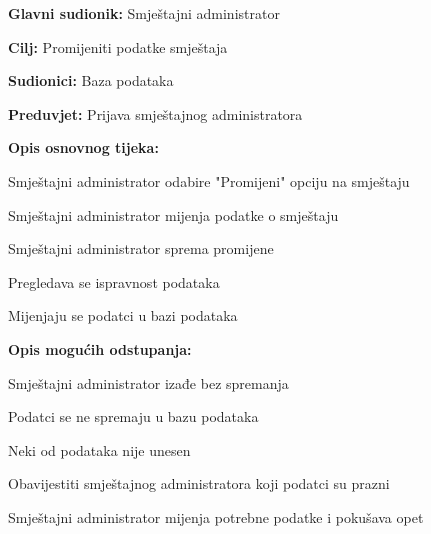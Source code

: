 				\noindent {}
				\begin{packed_item}
					
					\item \textbf{Glavni sudionik: }Smještajni administrator
					\item  \textbf{Cilj:} Promijeniti podatke smještaja
					\item  \textbf{Sudionici:} Baza podataka
					\item  \textbf{Preduvjet:} Prijava smještajnog administratora
					\item  \textbf{Opis osnovnog tijeka:}
					
					\item[] \begin{packed_enum}
						
						\item Smještajni administrator odabire "Promijeni" opciju na smještaju
						\item Smještajni administrator mijenja podatke o smještaju
						\item Smještajni administrator sprema promijene
						\item Pregledava se ispravnost podataka
						\item Mijenjaju se podatci u bazi podataka
					\end{packed_enum}
					
					\item  \textbf{Opis mogućih odstupanja:}
					
					\item[] \begin{packed_item}
						
						\item[3.a] Smještajni administrator izađe bez spremanja
						\item[] \begin{packed_enum}
							
							\item Podatci se ne spremaju u bazu podataka
							
						\end{packed_enum}
						
						\item[4.a] Neki od podataka nije unesen
						\item[] \begin{packed_enum}
							
							\item Obavijestiti smještajnog administratora koji podatci su prazni
							\item Smještajni administrator mijenja potrebne podatke i pokušava opet
							
						\end{packed_enum}
						
					\end{packed_item}
				\end{packed_item}
				
